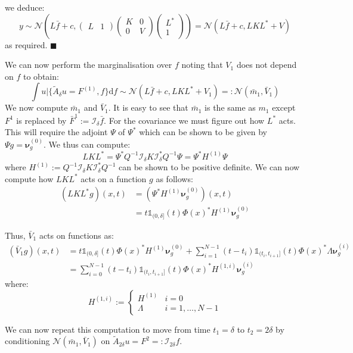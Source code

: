 \documentclass{article}
\renewcommand\qedsymbol{$\blacksquare$}
\theoremstyle{definition}
\theoremstyle{remark}
\theoremstyle{remark}
\begin{document}
we deduce:
\begin{equation*}
    y\sim\mathcal{N}\left(L\bar{f}+c, \begin{pmatrix}
        L & 1
    \end{pmatrix}\begin{pmatrix}
                    K & 0 \\
                    0 & V
                \end{pmatrix}\begin{pmatrix}
                    L^{*} \\
                    1
                \end{pmatrix}\right)=\mathcal{N}(L\bar{f}+c,LKL^{*}+V)
\end{equation*}
as required. \qedsymbol

\noindent We can now perform the marginalisation over $f$ noting that $V_1$ does not depend on $f$ to obtain:
\begin{equation}
    \int u|\{\tilde{A}_{\delta}u=F^{(1)},f\}\mathrm{d}f\sim\mathcal{N}(L\bar{f}+c,LKL^{*}+V_{1})=:\mathcal{N}(\bar{m}_{1},\bar{V}_{1})
\end{equation}
We now compute $\bar{m}_1$ and $\bar{V}_1$. It is easy to see that $\bar{m}_{1}$ is the same as $m_1$ except $F^1$ is replaced by $\bar{F}^1:=\mathcal{I}_{\delta}\bar{f}$. For the covariance we must figure out how $L^{*}$ acts. This will require the adjoint $\Psi$ of $\Psi^{*}$ which can be shown to be given by $\Psi g=\boldsymbol{\nu}_{g}^{(0)}$. We thus can compute:
\begin{equation}
    LKL^{*} = \Psi^{*}Q^{-1}\mathcal{I}_{\delta}K\mathcal{I}_{\delta}^{*}Q^{-1}\Psi = \Psi^{*}H^{(1)}\Psi
\end{equation}
where $H^{(1)}:=Q^{-1}\mathcal{I}_{\delta}K\mathcal{I}_{\delta}^{*}Q^{-1}$ can be shown to be positive definite. We can now compute how $LKL^{*}$ acts on a function $g$ as follows:
\begin{align*}
    (LKL^{*}g)(x,t) &= (\Psi^{*}H^{(1)}\boldsymbol{\nu}_{g}^{(0)})(x,t) \\ &=t\mathbb{1}_{(0,\delta]}(t)\Phi(x)^{*}H^{(1)}\boldsymbol{\nu}_{g}^{(0)}
\end{align*}

\noindent Thus, $\bar{V}_{1}$ acts on functions as:
\begin{align*}
    (\bar{V}_{1}g)(x,t) &= t\mathbb{1}_{(0,\delta]}(t)\Phi(x)^{*}H^{(1)}\boldsymbol{\nu}_{g}^{(0)} +\sum_{i=1}^{N-1}(t-t_{i})\mathbb{1}_{(t_{i},t_{i+1}]}(t)\Phi(x)^{*}\Lambda\boldsymbol{\nu}_{g}^{(i)} \\
    &=\sum_{i=0}^{N-1}(t-t_{i})\mathbb{1}_{(t_{i},t_{i+1}]}(t)\Phi(x)^{*}H^{(1,i)}\boldsymbol{\nu}_{g}^{(i)}
\end{align*}
where:
\begin{equation*}
    H^{(1,i)}:=\left\{
\begin{array}{ll}
      H^{(1)} & i=0 \\
      \Lambda & i=1,\dots,N-1
\end{array}
\right.
\end{equation*}

\noindent We can now repeat this computation to move from time $t_1=\delta$ to $t_2=2\delta$ by conditioning $\mathcal{N}(\bar{m}_1,\bar{V}_1)$ on $\tilde{A}_{2\delta}u=F^2=:\mathcal{I}_{2\delta}f$.
\end{document}
